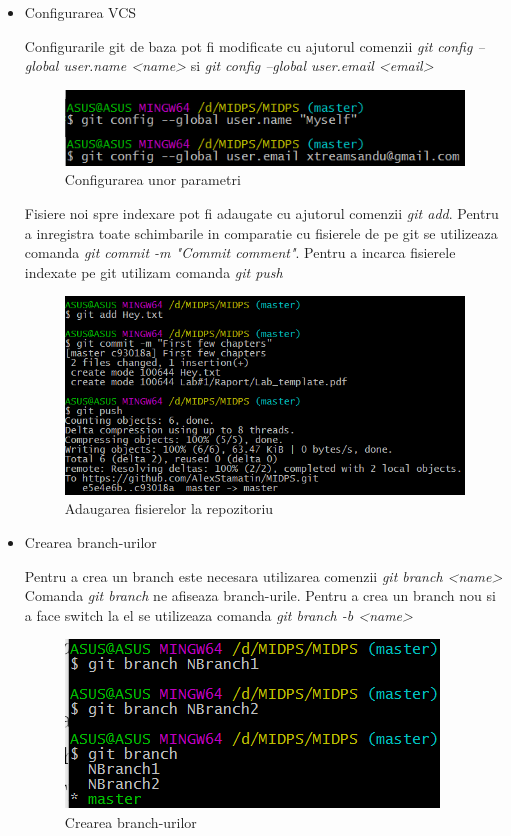 \begin{itemize}
\item Configurarea VCS

Configurarile git de baza pot fi modificate cu ajutorul comenzii \textit{git config --global user.name <name>} si \textit{git config --global user.email <email>}

\begin{figure}[h!]
			\centering
 			 \includegraphics[scale=0.75]{"task 3 gitconfig"}
 			 \caption{Configurarea unor parametri}
 			 \label{fig:clone_repo}
		\end{figure}
		
Fisiere noi spre indexare pot fi adaugate cu ajutorul comenzii \textit{git add}. Pentru a inregistra toate schimbarile in comparatie cu fisierele de pe git se utilizeaza comanda \textit{git commit -m "Commit comment"}. Pentru a incarca fisierele indexate pe git utilizam comanda \textit{git push}

\begin{figure}[h!]
			\centering
 			 \includegraphics[scale=0.75]{"task 3 commit"}
 			 \caption{Adaugarea fisierelor la repozitoriu}
 			 \label{fig:clone_repo}
		\end{figure}
		
\item Crearea branch-urilor

Pentru a crea un branch este necesara utilizarea comenzii \textit{git branch <name>} Comanda \textit{git branch} ne afiseaza branch-urile. Pentru a crea un branch nou si a face switch la el se utilizeaza comanda \textit{git branch -b <name>}

\begin{figure}[h!]
			\centering
 			 \includegraphics[scale=0.75]{"task 4 create branch"}
 			 \caption{Crearea branch-urilor}
 			 \label{fig:clone_repo}
		\end{figure}


\end{itemize}

